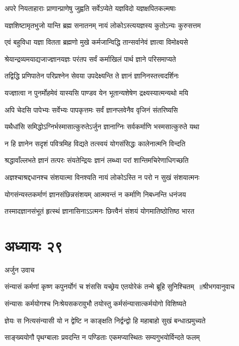 \twolineshloka
{अपरे नियताहाराः प्राणान्प्राणेषु जुह्वति}
{सर्वेऽप्येते यज्ञविदो यज्ञक्षपितकल्मषाः}


\twolineshloka
{यज्ञशिष्टामृतभुजो यान्ति ब्रह्म सनातनम्}
{नायं लोकोऽस्त्ययज्ञस्य कुतोऽन्यः कुरुसत्तम}


\twolineshloka
{एवं बहुविधा यज्ञा वितता ब्रह्मणो मुखे}
{कर्मजान्विद्धि तान्सर्वानेवं ज्ञात्वा विमोक्ष्यसे}


\twolineshloka
{श्रेयान्द्रव्यमयाद्यजाज्ज्ञानयज्ञः परंतप}
{सर्वं कर्माखिलं पार्थ ज्ञाने परिसमाप्यते}


\twolineshloka
{तद्विद्धि प्रणिपातेन परिप्रश्नेन सेवया}
{उपदेक्ष्यन्ति ते ज्ञानं ज्ञानिनस्तत्त्वदर्शिनः}


\twolineshloka
{यज्ज्ञात्वा न पुनर्मोहमेवं यास्यसि पाण्डव}
{येन भूतान्यशेषेण द्रक्ष्यस्यात्मन्यथो मयि}


\twolineshloka
{अपि चेदसि पापेभ्यः सर्वेभ्यः पापकृत्तमः}
{सर्वं ज्ञानप्लवेनैव वृजिनं संतरिष्यसि}


\twolineshloka
{यथैधांसि समिद्धोऽग्निर्भस्मासात्कुरुतेऽर्जुन}
{ज्ञानाग्निः सर्वकर्माणि भस्मसात्कुरुते यथा}


\twolineshloka
{न हि ज्ञानेन सदृशं पवित्रमिह विद्यते}
{तत्स्वयं योगसंसिद्धः कालेनात्मनि विन्दति}


\twolineshloka
{श्रद्धावाँल्लभते ज्ञानं तत्परः संयतेन्द्रियः}
{ज्ञानं लब्ध्वा परां शान्तिमचिरेणाधिगच्छति}


\twolineshloka
{अज्ञश्चाश्रद्दधानश्च संशयात्मा विनश्यति}
{नायं लोकोऽस्ति न परो न सुखं संशयात्मनः}


\twolineshloka
{योगसंन्यस्तकर्माणं ज्ञानसंछिन्नसंशयम्}
{आत्मवन्तं न कर्माणि निबध्नन्ति धनंजय}


\twolineshloka
{तस्मादज्ञानसंभूतं हृत्स्थं ज्ञानासिनाऽऽत्मनः}
{छित्त्वैनं संशयं योगमातिष्ठोत्तिष्ठ भारत}


\chapter{अध्यायः २९}
\twolineshloka
{अर्जुन उवाच}
{}


\threelineshloka
{संन्यासं कर्मणां कृष्ण कपुनर्योगं च शंससि}
{यच्छ्रेय एतयोरेकं तन्मे ब्रूहि सुनिश्चितम् ॥श्रीभगवानुवाच}
{}


\twolineshloka
{संन्यासः कर्मयोगश्च निःश्रेयसकरावुभौ}
{तयोस्तु कर्मसंन्यासात्कर्मयोगो विशिष्यते}


\twolineshloka
{ज्ञेयः स नित्यसंन्यासी यो न द्वेष्टि न काङ्क्षति}
{निर्द्वन्द्वो हि महाबाहो सुखं बन्धात्प्रमुच्यते}


\twolineshloka
{साङ्ख्ययोगौ पृथग्बालाः प्रवदन्ति न पण्डिताः}
{एकमप्यास्थितः सम्यगुभयोर्विन्दते फलम्}


